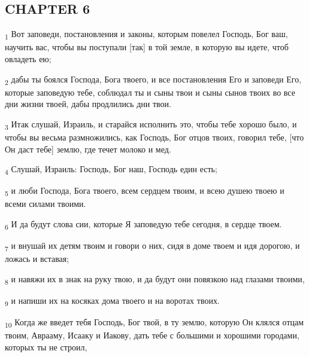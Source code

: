 \subsection{CHAPTER 6}
\begin{tcolorbox}
\textsubscript{1} Вот заповеди, постановления и законы, которым повелел Господь, Бог ваш, научить вас, чтобы вы поступали [так] в той земле, в которую вы идете, чтоб овладеть ею;
\end{tcolorbox}
\begin{tcolorbox}
\textsubscript{2} дабы ты боялся Господа, Бога твоего, и все постановления Его и заповеди Его, которые заповедую тебе, соблюдал ты и сыны твои и сыны сынов твоих во все дни жизни твоей, дабы продлились дни твои.
\end{tcolorbox}
\begin{tcolorbox}
\textsubscript{3} Итак слушай, Израиль, и старайся исполнить это, чтобы тебе хорошо было, и чтобы вы весьма размножились, как Господь, Бог отцов твоих, говорил тебе, [что Он даст тебе] землю, где течет молоко и мед.
\end{tcolorbox}
\begin{tcolorbox}
\textsubscript{4} Слушай, Израиль: Господь, Бог наш, Господь един есть;
\end{tcolorbox}
\begin{tcolorbox}
\textsubscript{5} и люби Господа, Бога твоего, всем сердцем твоим, и всею душею твоею и всеми силами твоими.
\end{tcolorbox}
\begin{tcolorbox}
\textsubscript{6} И да будут слова сии, которые Я заповедую тебе сегодня, в сердце твоем.
\end{tcolorbox}
\begin{tcolorbox}
\textsubscript{7} и внушай их детям твоим и говори о них, сидя в доме твоем и идя дорогою, и ложась и вставая;
\end{tcolorbox}
\begin{tcolorbox}
\textsubscript{8} и навяжи их в знак на руку твою, и да будут они повязкою над глазами твоими,
\end{tcolorbox}
\begin{tcolorbox}
\textsubscript{9} и напиши их на косяках дома твоего и на воротах твоих.
\end{tcolorbox}
\begin{tcolorbox}
\textsubscript{10} Когда же введет тебя Господь, Бог твой, в ту землю, которую Он клялся отцам твоим, Аврааму, Исааку и Иакову, дать тебе с большими и хорошими городами, которых ты не строил,
\end{tcolorbox}
